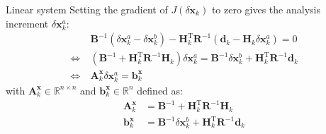 \documentclass[10pt]{beamer}
\begin{document}
\begin{frame}{Linear system}
Setting the gradient of $J(\delta \mathbf{x}_k)$ to zero gives the analysis increment $\delta \mathbf{x}^a_k$:
\begin{align}
\label{eq:inc}
& \ \mathbf{B}^{-1} \left(\delta \mathbf{x}^a_k - \delta \mathbf{x}^b_k\right) - \mathbf{H}_k^\mathrm{T} \mathbf{R}^{-1} \left(\mathbf{d}_k - \mathbf{H}_k \delta \mathbf{x}^a_k\right) = 0 \nonumber \\
\Leftrightarrow & \ \left(\mathbf{B}^{-1} + \mathbf{H}_k^\mathrm{T} \mathbf{R}^{-1} \mathbf{H}_k\right) \delta \mathbf{x}^a_k = \mathbf{B}^{-1} \delta \mathbf{x}^b_k + \mathbf{H}_k^\mathrm{T} \mathbf{R}^{-1} \mathbf{d}_k \nonumber \\
\Leftrightarrow & \ \boxed{\mathbf{A}^\mathbf{x}_k \delta \mathbf{x}^a_k = \mathbf{b}^\mathbf{x}_k}
\end{align}
with $\mathbf{A}^\mathbf{x}_k \in \mathbb{R}^{n \times n}$ and $\mathbf{b}^\mathbf{x}_k \in \mathbb{R}^{n}$ defined as:
\begin{align}
\mathbf{A}^\mathbf{x}_k & = \mathbf{B}^{-1} + \mathbf{H}_k^\mathrm{T} \mathbf{R}^{-1} \mathbf{H}_k \\
\mathbf{b}^\mathbf{x}_k & = \mathbf{B}^{-1} \delta \mathbf{x}^b_k + \mathbf{H}_k^\mathrm{T} \mathbf{R}^{-1} \mathbf{d}_k
\end{align}
\end{frame}
\end{document}
